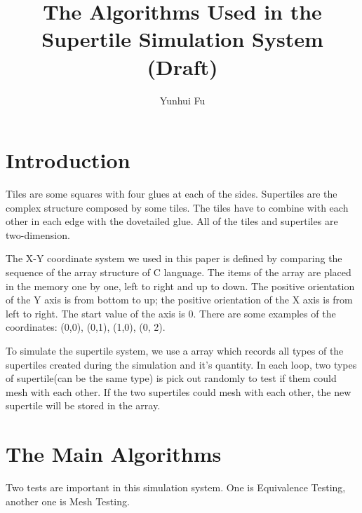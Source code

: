 \documentclass[preprint,natbib,10pt]{article}
\begin{document}
\renewcommand\figurename{Figure}

\title{The Algorithms Used in the Supertile Simulation System (Draft)}
\author{Yunhui Fu}
\date{} %


\maketitle

\tableofcontents

\section{Introduction}
Tiles are some squares with four glues at each of the sides. Supertiles are the complex structure composed by some tiles. The tiles have to combine with each other in each edge with the dovetailed glue. All of the tiles and supertiles are two-dimension.

The X-Y coordinate system we used in this paper is defined by comparing the sequence of the array structure of C language. The items of the array are placed in the memory one by one, left to right and up to down. The positive orientation of the Y axis is from bottom to up; the positive orientation of the X axis is from left to right. The start value of the axis is 0. There are some examples of the coordinates: (0,0), (0,1), (1,0), (0, 2).

To simulate the supertile system, we use a array which records all types of the supertiles created during the simulation and it's quantity. In each loop, two types of supertile(can be the same type) is pick out randomly to test if them could mesh with each other. If the two supertiles could mesh with each other, the new supertile will be stored in the array.

\section{The Main Algorithms}
Two tests are important in this simulation system. One is Equivalence Testing, another one is Mesh Testing.
\end{document}
